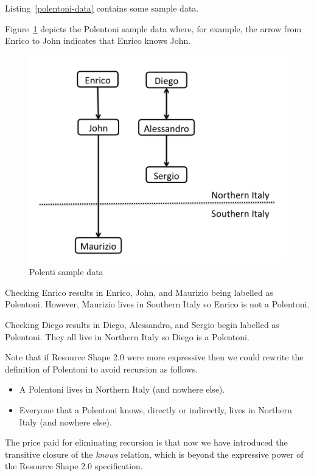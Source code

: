 \documentclass{article}
\begin{document}
Listing~\ref{polentoni-data} contains some sample data.


Figure~\ref{fig:polentoni-data} depicts the Polentoni sample data where, for example, the arrow from Enrico to John
indicates that Enrico knows John.

\begin{figure}[h]
\centering
\includegraphics[scale=0.5]{polentoni-data}
\caption{Polenti sample data}
\label{fig:polentoni-data}
\end{figure}

Checking Enrico results in Enrico, John, and Maurizio being labelled as Polentoni. 
However, Maurizio lives in Southern Italy so Enrico is not a Polentoni.

Checking Diego results in Diego, Alessandro, and Sergio begin labelled as Polentoni.
They all live in Northern Italy so Diego is a Polentoni.

Note that if Resource Shape 2.0 were more expressive then we could rewrite the definition of Polentoni to avoid recursion as follows.
\begin{itemize}
\item A Polentoni lives in Northern Italy (and nowhere else).
\item Everyone that a Polentoni knows, directly or indirectly, lives in Northern Italy (and nowhere else).
\end{itemize}
The price paid for eliminating recursion is that now we have introduced the transitive closure of the {\em knows} relation, which is beyond the expressive power of the Resource Shape 2.0 specification.
\end{document}

